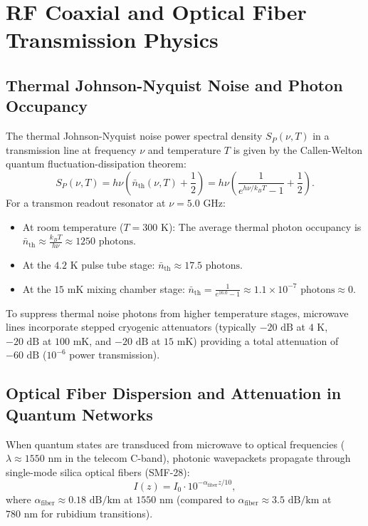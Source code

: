 \section{RF Coaxial and Optical Fiber Transmission Physics}
\label{sec:app_rf_optical_physics}

\subsection{Thermal Johnson-Nyquist Noise and Photon Occupancy}
The thermal Johnson-Nyquist noise power spectral density $S_P(\nu, T)$ in a transmission line at frequency $\nu$ and temperature $T$ is given by the Callen-Welton quantum fluctuation-dissipation theorem:
\begin{equation}
    S_P(\nu, T) = h \nu \left( \bar{n}_{\text{th}}(\nu, T) + \frac{1}{2} \right) = h \nu \left( \frac{1}{e^{h \nu / k_B T} - 1} + \frac{1}{2} \right).
    \label{eq:thermal_johnson_noise}
\end{equation}
For a transmon readout resonator at $\nu = 5.0\text{ GHz}$:
\begin{itemize}
    \item At room temperature ($T = 300\text{ K}$): The average thermal photon occupancy is $\bar{n}_{\text{th}} \approx \frac{k_B T}{h \nu} \approx 1250\text{ photons}$.
    \item At the $4.2\text{ K}$ pulse tube stage: $\bar{n}_{\text{th}} \approx 17.5\text{ photons}$.
    \item At the $15\text{ mK}$ mixing chamber stage: $\bar{n}_{\text{th}} = \frac{1}{e^{16.0} - 1} \approx 1.1 \times 10^{-7}\text{ photons} \approx 0$.
\end{itemize}
To suppress thermal noise photons from higher temperature stages, microwave lines incorporate stepped cryogenic attenuators (typically $-20\text{ dB}$ at $4\text{ K}$, $-20\text{ dB}$ at $100\text{ mK}$, and $-20\text{ dB}$ at $15\text{ mK}$) providing a total attenuation of $-60\text{ dB}$ ($10^{-6}$ power transmission).

\subsection{Optical Fiber Dispersion and Attenuation in Quantum Networks}
When quantum states are transduced from microwave to optical frequencies ($\lambda \approx 1550\text{ nm}$ in the telecom C-band), photonic wavepackets propagate through single-mode silica optical fibers (SMF-28):
\begin{equation}
    I(z) = I_0 \cdot 10^{-\alpha_{\text{fiber}} z / 10},
\end{equation}
where $\alpha_{\text{fiber}} \approx 0.18\text{ dB/km}$ at $1550\text{ nm}$ (compared to $\alpha_{\text{fiber}} \approx 3.5\text{ dB/km}$ at $780\text{ nm}$ for rubidium transitions).

